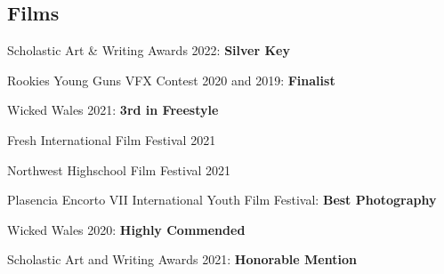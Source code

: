\documentclass[]{deedy-resume-openfont}
\begin{document}
\begin{paracol}{2}
%
%

\switchcolumn



\section{Films}
\begin{tightemize}
\item Scholastic Art \& Writing Awards 2022: \textbf{Silver Key}
\end{tightemize}
\sectionsep

\begin{tightemize}
\item Rookies Young Guns VFX Contest 2020 and 2019: \textbf{Finalist}
\end{tightemize}
\sectionsep

\sectionsep

\begin{tightemize}
\item Wicked Wales 2021: \textbf{3rd in Freestyle}
\item Fresh International Film Festival 2021
\item Northwest Highschool Film Festival 2021
\end{tightemize}
\sectionsep


\begin{tightemize}
\item Plasencia Encorto VII International Youth Film Festival: \textbf{Best Photography}
\item Wicked Wales 2020: \textbf{Highly Commended}
\item Scholastic Art and Writing Awards 2021: \textbf{Honorable Mention}
\end{tightemize}
\sectionsep


\end{paracol}
\end{document}
